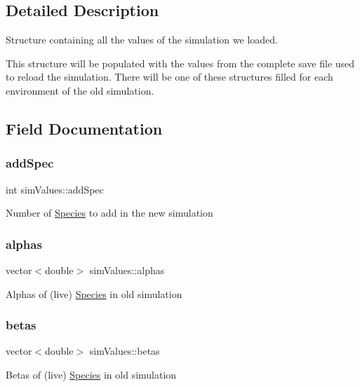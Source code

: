 \subsection{Detailed Description}
Structure containing all the values of the simulation we loaded. 

This structure will be populated with the values from the complete save file used to reload the simulation. There will be one of these structures filled for each environment of the old simulation. 

\subsection{Field Documentation}
\mbox{\label{structsimValues_ac7fbf812eba3e2b88996d1366131bf8e}} 
\subsubsection{\texorpdfstring{add\+Spec}{addSpec}}
{\footnotesize\ttfamily int sim\+Values\+::add\+Spec}

Number of \hyperlink{classSpecies}{Species} to add in the new simulation \mbox{\label{structsimValues_aa7977c641471b71ca3f88d98e2b01831}} 
\subsubsection{\texorpdfstring{alphas}{alphas}}
{\footnotesize\ttfamily vector$<$double$>$ sim\+Values\+::alphas}

Alphas of (live) \hyperlink{classSpecies}{Species} in old simulation \mbox{\label{structsimValues_ab7b209f99b228a55680d64fc964b0d34}} 
\subsubsection{\texorpdfstring{betas}{betas}}
{\footnotesize\ttfamily vector$<$double$>$ sim\+Values\+::betas}

Betas of (live) \hyperlink{classSpecies}{Species} in old simulation \mbox{\label{structsimValues_a08f1c4e0b6042043876d9d2d2699a922}} 
